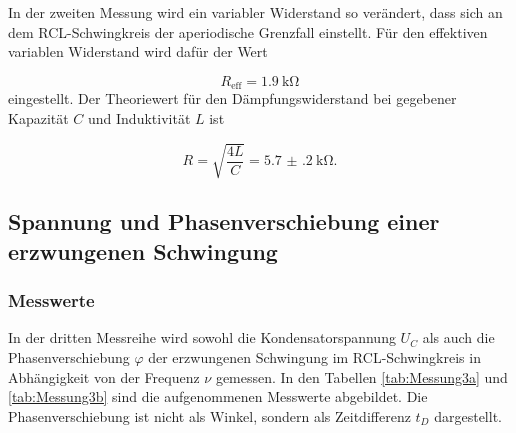 In der zweiten Messung wird ein variabler Widerstand so verändert, dass
sich an dem RCL-Schwingkreis der aperiodische Grenzfall einstellt.
Für den effektiven variablen Widerstand wird dafür der Wert

\begin{equation}
  R_\text{eff} = \SI{1.9}{\kilo\ohm}
\end{equation}
eingestellt.
Der Theoriewert für den Dämpfungswiderstand bei gegebener Kapazität $C$ und
Induktivität $L$ ist

\begin{equation}
  R = \sqrt{\frac{4L}{C}} = \SI{5.7(2)}{\kilo\ohm}.
\end{equation}


\subsection{Spannung und Phasenverschiebung
einer erzwungenen Schwingung}

\subsubsection{Messwerte}

In der dritten Messreihe wird sowohl die Kondensatorspannung $U_C$ als auch die
Phasenverschiebung $\varphi$ der erzwungenen Schwingung im RCL-Schwingkreis in
Abhängigkeit von der Frequenz $\nu$ gemessen.
In den Tabellen \ref{tab:Messung3a} und \ref{tab:Messung3b}
sind die aufgenommenen Messwerte abgebildet.
Die Phasenverschiebung ist nicht als Winkel, sondern als Zeitdifferenz $t_D$
dargestellt.

